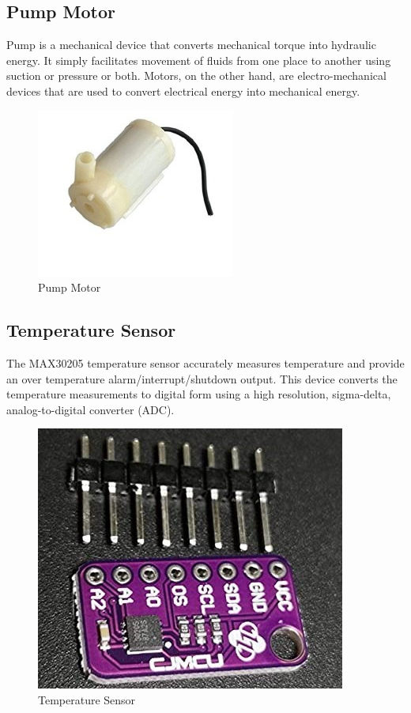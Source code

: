 \documentclass[a4paper,12pt]{report}
\begin{document}
\subsection{ Pump Motor}
Pump is a mechanical device that converts mechanical torque into hydraulic energy. It
simply facilitates movement of fluids from one place to another using suction or pressure or both. Motors, on the other hand, are electro-mechanical devices that are used to convert
electrical energy into mechanical energy.
\begin{figure}[h] %
   \begin{center}
   \includegraphics[scale=0.5]{pump motor.jpg}
   \caption{Pump Motor}
  \end{center}
  \end{figure}
\subsection{Temperature Sensor}
The MAX30205 temperature sensor accurately measures temperature and provide an over
temperature alarm/interrupt/shutdown output. This device converts the temperature measurements to digital form using a high resolution, sigma-delta, analog-to-digital converter
(ADC).
\begin{figure}[h] %
   \begin{center}
   \includegraphics[scale=0.7]{temp sensor.jpg}
   \caption{Temperature Sensor}
  \end{center}
  \end{figure}
  \
\end{document}
